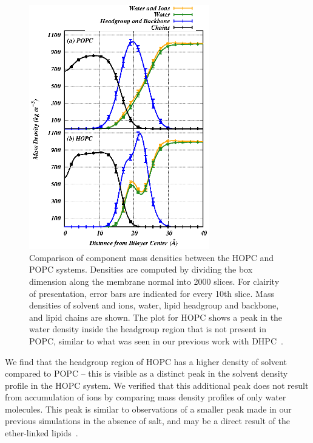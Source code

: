 \documentclass[12pt,openany,final]{book}
\begin{document}
\begin{figure}[p]
    \caption[Comparison of component mass densities between the HOPC and POPC systems.]{ 
Comparison of component mass densities between the HOPC and POPC systems. 
Densities are computed by dividing the box dimension along the membrane normal into 2000 slices. For 
clairity of presentation, error bars are indicated for every 10th slice. 
Mass densities of solvent and ions, water, lipid headgroup and backbone, and lipid chains are shown. 
The plot for HOPC shows a peak in the water density inside the headgroup region that is not present in POPC, 
similar to what was seen in our previous work with DHPC~\cite{kruczek:2017:ether}. 
}
\label{fig:massdens}
\includegraphics[width=	0.7\textwidth]{dens_3component.eps}
\end{figure}
We find that the headgroup region of 
HOPC has a higher density of solvent compared to POPC -- this is visible as 
a distinct peak in the solvent density profile in the HOPC system. 
We verified that this additional peak does not
result from accumulation of ions by comparing mass density profiles of only water molecules. This
peak is similar to observations of a smaller peak 
made in our previous simulations in the absence of salt,
and may be a direct result of the ether-linked lipids~\cite{kruczek:2017:ether}.
\end{document}
